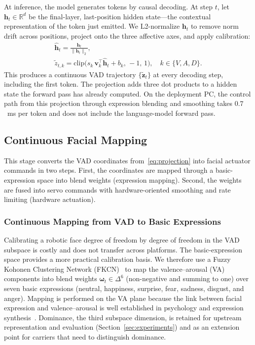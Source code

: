 \documentclass[letterpaper, 10 pt, conference]{ieeeconf/ieeeconf}
\begin{document}
At inference, the model generates tokens by causal decoding.
At step $t$, let $\mathbf{h}_t \in \mathbb{R}^{d}$ be the final-layer, last-position hidden state---the contextual representation of the token just emitted.
We L2-normalize $\mathbf{h}_t$ to remove norm drift across positions, project onto the three affective axes, and apply calibration:
\begin{equation}
\begin{gathered}
    \hat{\mathbf{h}}_t = \frac{\mathbf{h}_t}{\|\mathbf{h}_t\|_2}, \\[2pt]
    \tilde{z}_{t,k} = \mathrm{clip}\bigl(s_k\,\mathbf{v}_k^\top\hat{\mathbf{h}}_t + b_k,\,-1,\,1\bigr),
    \quad k \in \{V, A, D\}.
\end{gathered}
\label{eq:projection}
\end{equation}
This produces a continuous VAD trajectory $\{\tilde{\mathbf{z}}_t\}$ at every decoding step, including the first token.
The projection adds three dot products to a hidden state the forward pass has already computed. On the deployment PC, the control path from this projection through expression blending and smoothing takes $0.7$~ms per token and does not include the language-model forward pass.

\subsection{Continuous Facial Mapping}
\label{sec:actuator}

This stage converts the VAD coordinates from~\eqref{eq:projection} into facial actuator commands in two steps. First, the coordinates are mapped through a basic-expression space into blend weights (expression mapping). Second, the weights are fused into servo commands with hardware-oriented smoothing and rate limiting (hardware actuation).

\subsubsection{Continuous Mapping from VAD to Basic Expressions}
Calibrating a robotic face degree of freedom by degree of freedom in the VAD subspace is costly and does not transfer across platforms. The basic-expression space provides a more practical calibration basis.
We therefore use a Fuzzy Kohonen Clustering Network (FKCN)~\cite{han2010fkcn} to map the valence--arousal (VA) components into blend weights $\boldsymbol{\omega}_t \in \Delta^{6}$ (non-negative and summing to one) over seven basic expressions (neutral, happiness, surprise, fear, sadness, disgust, and anger).
Mapping is performed on the VA plane because the link between facial expression and valence--arousal is well established in psychology and expression synthesis~\cite{russell1980circumplex,breazeal2002designing}. Dominance, the third subspace dimension, is retained for upstream representation and evaluation (Section~\ref{sec:experiments}) and as an extension point for carriers that need to distinguish dominance.
\end{document}
